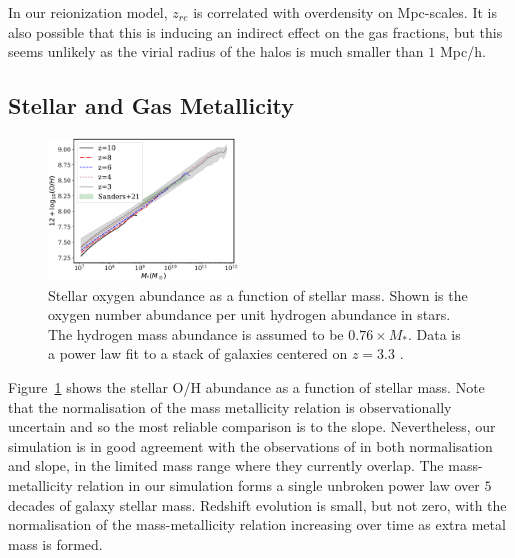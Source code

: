 \documentclass[fleqn,usenatbib]{mnras}
\begin{document}
In our reionization model, $z_{re}$ is correlated with overdensity on Mpc-scales. It is also possible that this is inducing an indirect effect on the gas fractions, but this seems unlikely as the virial radius of the halos is much smaller than $1$ Mpc/h.


\subsection{Stellar and Gas Metallicity}

\begin{figure}
\centering
  \includegraphics[width=0.45\textwidth]{plots/starmetal_oh.pdf}    
  \caption{Stellar oxygen abundance as a function of stellar mass. Shown is the oxygen number abundance per unit hydrogen abundance in stars. The hydrogen mass abundance is assumed to be $0.76\times M_*$. Data is a power law fit to a stack of galaxies centered on $z=3.3$ \protect\citep{2021ApJ...914...19S}.}
  \label{fig:stellar_metal}
\end{figure}


Figure~\ref{fig:stellar_metal} shows the stellar O/H abundance as a function of stellar mass. Note that the normalisation of the mass metallicity relation is observationally uncertain \citep{2019MNRAS.484.5587T} and so the most reliable comparison is to the slope. Nevertheless, our simulation is in good agreement with the observations of \cite{2021ApJ...914...19S} in both normalisation and slope, in the limited mass range where they currently overlap. The mass-metallicity relation in our simulation forms a single unbroken power law over $5$ decades of galaxy stellar mass. Redshift evolution is small, but not zero, with the normalisation of the mass-metallicity relation increasing over time as extra metal mass is formed. 
\end{document}
